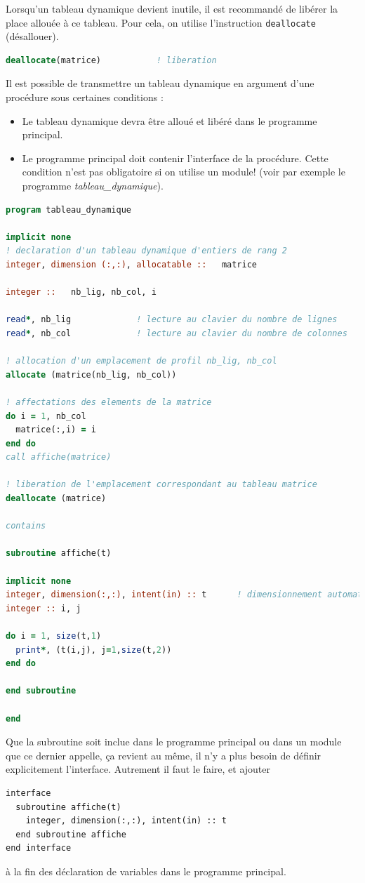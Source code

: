 \documentclass[a4paper,twoside]{article}
\begin{document}
Lorsqu'un tableau dynamique devient inutile, il est recommandé de libérer la place allouée à ce tableau. Pour cela, on utilise l'instruction \texttt{deallocate} (désallouer).
\begin{lstlisting}[language=Fortran]
deallocate(matrice)           ! liberation
\end{lstlisting}

\bigskip

Il est possible de transmettre un tableau dynamique en argument d'une procédure sous certaines conditions : 
\begin{itemize}
\item Le tableau dynamique devra être alloué et libéré dans le programme principal. 
\item Le programme principal doit contenir l'interface de la procédure. Cette condition n'est pas obligatoire si on utilise un module! (voir par exemple le programme \emph{tableau\_dynamique}).
\end{itemize}

\begin{lstlisting}[language=Fortran]
program tableau_dynamique
 
implicit none 
! declaration d'un tableau dynamique d'entiers de rang 2 
integer, dimension (:,:), allocatable ::   matrice

integer ::   nb_lig, nb_col, i

read*, nb_lig             ! lecture au clavier du nombre de lignes
read*, nb_col             ! lecture au clavier du nombre de colonnes

! allocation d'un emplacement de profil nb_lig, nb_col
allocate (matrice(nb_lig, nb_col))    

! affectations des elements de la matrice 
do i = 1, nb_col
  matrice(:,i) = i
end do
call affiche(matrice)

! liberation de l'emplacement correspondant au tableau matrice 
deallocate (matrice) 

contains

subroutine affiche(t)
 
implicit none 
integer, dimension(:,:), intent(in) :: t      ! dimensionnement automatique
integer :: i, j 

do i = 1, size(t,1) 
  print*, (t(i,j), j=1,size(t,2))
end do

end subroutine

end 

\end{lstlisting}
Que la subroutine soit inclue dans le programme principal ou dans un module que ce dernier appelle, ça revient au même, il n'y a plus besoin de définir explicitement l'interface. Autrement il faut le faire, et ajouter
\begin{verbatim}
interface 
  subroutine affiche(t) 
    integer, dimension(:,:), intent(in) :: t 
  end subroutine affiche 
end interface 
\end{verbatim}
à la fin des déclaration de variables dans le programme principal.
\end{document}
